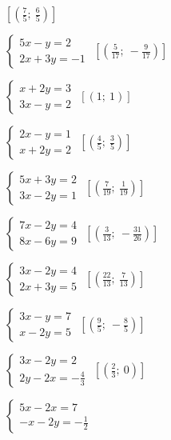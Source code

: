 \begin{esercizio}[\Ast]
\begin{multicols}{2}
\begin{enumeratea}
 \hfill \(\left[\left(\frac{7}{5};~\frac{6}{5}\right)\right]\)
\item \(\left\{\begin{array}{l}5x-y=2\\2x+3y=-1 \end{array}\right.\)
 \hfill \(\left[\left(\frac{5}{17};~-\frac{9}{17}\right)\right]\)
\item \(\left\{\begin{array}{l}x+2y=3 \\3x-y=2\end{array}\right.\)
 \hfill \(\left[(1;~1)\right]\)
\item \(\left\{\begin{array}{l}2x-y=1 \\x+2y=2\end{array}\right.\)
 \hfill \(\left[\left(\frac{4}{5};~\frac{3}{5}\right)\right]\)
\item \(\left\{\begin{array}{l}5x+3y=2 \\3x-2y=1\end{array}\right.\)
 \hfill \(\left[\left(\frac{7}{19};~\frac{1}{19}\right)\right]\)
\item \(\left\{\begin{array}{l}7x-2y=4\\8x-6y=9 \end{array}\right.\)
 \hfill \(\left[\left(\frac{3}{13};~-\frac{31}{26}\right)\right]\)
\item \(\left\{\begin{array}{l}3x-2y=4 \\2x+3y=5\end{array}\right.\)
 \hfill \(\left[\left(\frac{22}{13};~\frac{7}{13}\right)\right]\)
\item \(\left\{\begin{array}{l}3x-y=7 \\x-2y=5 \end{array}\right.\)
 \hfill \(\left[\left(\frac{9}{5};~-\frac{8}{5}\right)\right]\)
\item \(\left\{\begin{array}{l}3x-2y=2\\2y-2x=-{\frac{4}{3}} \end{array}\right.\)
 \hfill \(\left[(\frac{2}{3};~0)\right]\)
\item \(\left\{\begin{array}{l}5x-2x=7\\-x-2y=-{\frac{1}{2}} \end{array}\right.\)

\end{enumeratea}
\end{multicols}
\end{esercizio}
